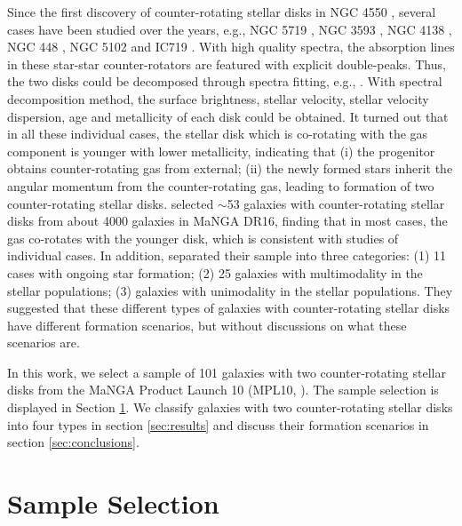 \documentclass{aastex631}
\begin{document}
Since the first discovery of counter-rotating stellar disks in NGC 4550 \citep{1992ApJ...394L...9R}, several cases have been studied over the years, e.g., NGC 5719 \citep{2011MNRAS.412L.113C}, NGC 3593 \citep{2013A&A...549A...3C}, NGC 4138 \citep{2014A&A...570A..79P}, NGC 448 \citep{2016MNRAS.461.2068K}, NGC 5102 \citep{2017MNRAS.464.4789M} and IC719 \citep{2018A&A...616A..22P}. With high quality spectra, the absorption lines in these star-star counter-rotators are featured with explicit double-peaks. Thus, the two disks could be decomposed through spectra fitting, e.g., \cite{2011MNRAS.412L.113C, 2016MNRAS.461.2068K}. With spectral decomposition method, the surface brightness, stellar velocity, stellar velocity dispersion, age and metallicity of each disk could be obtained. It turned out that in all these individual cases, the stellar disk which is co-rotating with the gas component is younger with lower metallicity, indicating that (i) the progenitor obtains counter-rotating gas from external; (ii) the newly formed stars inherit the angular momentum from the counter-rotating gas, leading to formation of two counter-rotating stellar disks. \cite{2021MNRAS.tmp.3448B} selected $\sim$53 galaxies with counter-rotating stellar disks from about 4000 galaxies in MaNGA DR16, finding that in most cases, the gas co-rotates with the younger disk, which is consistent with studies of individual cases. In addition, \cite{2021MNRAS.tmp.3448B} separated their sample into three categories: (1) 11 cases with ongoing star formation; (2) 25 galaxies with multimodality in the stellar populations; (3) galaxies with unimodality in the stellar populations. They suggested that these different types of galaxies with counter-rotating stellar disks have different formation scenarios, but without discussions on what these scenarios are.

In this work, we select a sample of 101 galaxies with two counter-rotating stellar disks from the MaNGA Product Launch 10 (MPL10, \citealt{2015ApJ...798....7B, 2015AJ....149...77D, 2015AJ....150...19L, 2016AJ....152...83L}). The sample selection is displayed in Section \ref{sec:sample}. We classify galaxies with two counter-rotating stellar disks into four types in section \ref{sec:results} and discuss their formation scenarios in section \ref{sec:conclusions}.

\section{Sample Selection} \label{sec:sample}
\end{document}
